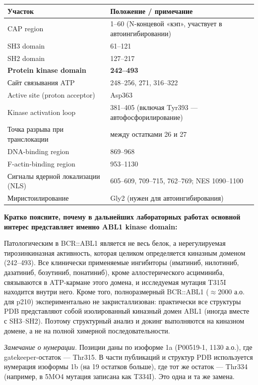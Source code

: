 \documentclass[11pt,a4paper]{article}
\newcommand{\code}[1]{{\ttfamily #1}}
\begin{document}
\begin{center}
\begin{tabular}{|L{6cm}|L{9.5cm}|}
\hline
\textbf{Участок} & \textbf{Положение / примечание} \\
\hline
CAP region & 1--60 (N-концевой «кэп», участвует в автоингибировании) \\
\hline
SH3 domain & 61--121 \\
\hline
SH2 domain & 127--217 \\
\hline
\textbf{Protein kinase domain} & \textbf{242--493} \\
\hline
Сайт связывания ATP & 248--256, 271, 316--322 \\
\hline
Active site (proton acceptor) & Asp363 \\
\hline
Kinase activation loop & 381--405 (включая Tyr393 --- автофосфорилирование) \\
\hline
Точка разрыва при транслокации & между остатками 26 и 27 \\
\hline
DNA-binding region & 869--968 \\
\hline
F-actin-binding region & 953--1130 \\
\hline
Сигналы ядерной локализации (NLS) & 605--609, 709--715, 762--769; NES 1090--1100 \\
\hline
Миристоилирование & Gly2 (нужен для автоингибирования) \\
\hline
\end{tabular}
\end{center}

\textbf{Кратко поясните, почему в дальнейших лабораторных работах основной интерес
представляет именно ABL1 kinase domain:}

Патологическим в BCR::ABL1 является не весь белок, а нерегулируемая тирозинкиназная
активность, которая целиком определяется киназным доменом (242--493). Все клинически
применяемые ингибиторы (иматиниб, нилотиниб, дазатиниб, бозутиниб, понатиниб), кроме
аллостерического асциминиба, связываются в ATP-кармане этого домена, и исследуемая
мутация T315I находится внутри него. Кроме того, полноразмерный BCR::ABL1
($\approx$2000 а.о. для p210) экспериментально не закристаллизован: практически все
структуры PDB представляют собой изолированный киназный домен ABL1 (иногда вместе с
SH3--SH2). Поэтому структурный анализ и докинг выполняются на киназном домене, а не на
полной химерной последовательности.

\emph{Замечание о нумерации.} Позиции даны по изоформе 1a (\code{P00519-1}, 1130 а.о.),
где gatekeeper-остаток --- Thr315. В части публикаций и структур PDB используется
нумерация изоформы 1b (на 19 остатков больше), где тот же остаток --- Thr334
(например, в \code{5MO4} мутация записана как \code{T334I}). Это одна и та же замена.
\end{document}
